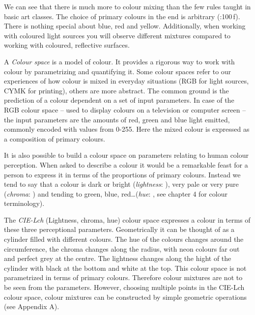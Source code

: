\documentclass[a4paper, 12pt]{scrartcl}
\begin{document}
We can see that there is much more to colour mixing than the few rules taught in basic art classes. The choice of primary colours in the end is arbitrary (\cite{Ware2013}:100\,f). There is nothing special about blue, red and yellow. Additionally, when working with coloured light sources you will observe different mixtures compared to working with coloured, reflective surfaces.

A \emph{Colour space} is a model of colour. It provides a rigorous way to work with colour by parametrizing and quantifying it. Some colour spaces refer to our experiences of how colour is mixed in everyday situations (RGB for light sources, CYMK for printing), others are more abstract. The common ground is the prediction of a colour dependent on a set of input parameters. In case of the RGB colour space -- used to display colours on a television or computer screen -- the input parameters are the amounts of red, green and blue light emitted, commonly encoded with values from 0-255. Here the mixed colour is expressed as a composition of primary colours.

It is also possible to build a colour space on parameters relating to human colour perception. When asked to describe a colour it would be a remarkable feast for a person to express it in terms of the proportions of primary colours. Instead we tend to say that a colour is dark or bright (\emph{lightness}:   ), very pale or very pure (\emph{chroma}:   ) and tending to green, blue, red\ldots (\emph{hue}:   , see \cite{Fairchild2005} chapter 4 for colour terminology).

The \emph{CIE-Lch} (Lightness, chroma, hue) colour space expresses a colour in terms of these three perceptional parameters. Geometrically it can be thought of as a cylinder filled with different colours. The hue of the colours changes around the circumference, the chroma changes along the radius, with neon colours far out and perfect grey at the centre. The lightness changes along the hight of the cylinder with black at the bottom and white at the top. This colour space is not parametrized in terms of primary colours. Therefore colour mixtures are not to be seen from the parameters. However, choosing multiple points in the CIE-Lch colour space, colour mixtures can be constructed by simple geometric operations (see Appendix A).
\end{document}
